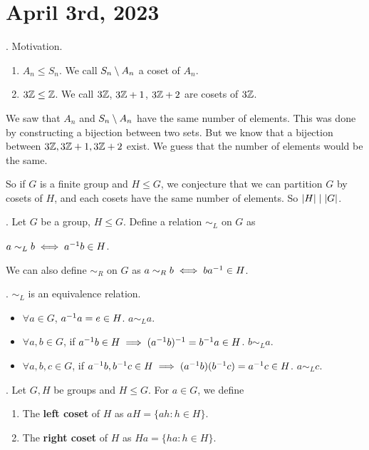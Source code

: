 \section*{April 3rd, 2023}


\ex. Motivation.
\begin{enumerate}
    \item \(A_n \leq S_n\). We call \(S_n \setminus A_n\) a coset of \(A_n\).
    \item \(3\mathbb{Z} \leq \mathbb{Z}\). We call \(3\mathbb{Z}\), \(3\mathbb{Z} + 1\), \(3\mathbb{Z} + 2\) are cosets of \(3\mathbb{Z}\).
\end{enumerate}

We saw that \(A_n\) and \(S_n \setminus A_n\) have the same number of elements. This was done by constructing a bijection between two sets. But we know that a bijection between \(3\mathbb{Z}, 3\mathbb{Z} + 1, 3\mathbb{Z} + 2\) exist. We guess that the number of elements would be the same.

So if \(G\) is a finite group and \(H \leq G\), we conjecture that we can partition \(G\) by cosets of \(H\), and each cosets have the same number of elements. So \(\left| H \right| \mid \left| G \right|\).

\bigskip

. Let \(G\) be a group, \(H \leq G\). Define a relation \(\sim_L\) on \(G\) as
\begin{center}
    \(a \sim_L b \iff a^{-1} b \in H\).
\end{center}

\rmk We can also define \(\sim_R\) on \(G\) as \(a \sim_R b \iff ba^{-1} \in H\).

\thm. \(\sim_L\) is an equivalence relation.

\pf
\begin{itemize}
    \item \(\forall a \in G\), \(a^{-1} a = e \in H\). \(a \sim_L a\).
    \item \(\forall a, b\in G\), if \(a^{-1} b \in H \implies (a^{-1} b)^{-1} = b^{-1} a \in H\). \(b \sim_L a\).
    \item\(\forall a, b, c\in G\), if \(a^{-1} b, b^{-1} c \in H \implies (a^{-1} b)(b^{-1} c) = a^{-1} c \in H\). \(a \sim_L c\).
\end{itemize}

.  Let \(G, H\) be groups and \(H \leq G\). For \(a \in G\), we define
\begin{enumerate}
    \item The \textbf{left coset} of \(H\) as \(aH = \{ah : h \in H\}\).
    \item The \textbf{right coset} of \(H\) as \(Ha = \{ha : h \in H\}\).
\end{enumerate}

